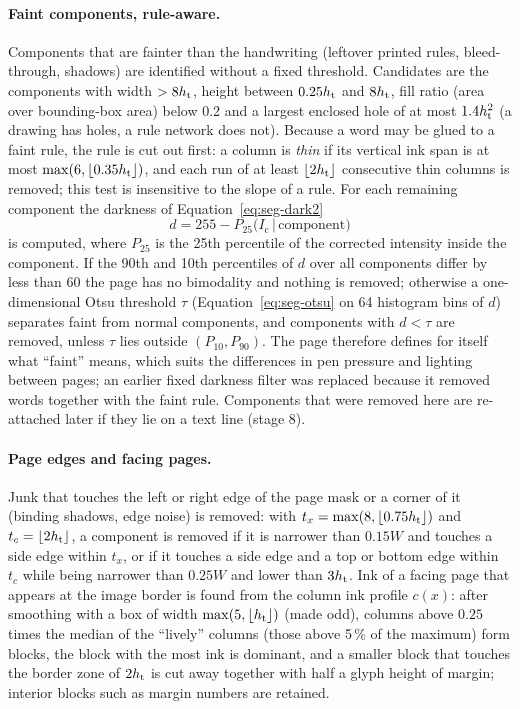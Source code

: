 \paragraph{Faint components, rule-aware.}
Components that are fainter than the handwriting (leftover printed rules, bleed-through, shadows) are identified without a fixed threshold.
Candidates are the components with width $>8h_{\mathrm{t}}$, height between $0.25h_{\mathrm{t}}$ and $8h_{\mathrm{t}}$, fill ratio (area over bounding-box area) below 0.2 and a largest enclosed hole of at most $1.4h_{\mathrm{t}}^2$ (a drawing has holes, a rule network does not).
Because a word may be glued to a faint rule, the rule is cut out first: a column is \emph{thin} if its vertical ink span is at most $\max(6,\lfloor0.35h_{\mathrm{t}}\rfloor)$, and each run of at least $\lfloor2h_{\mathrm{t}}\rfloor$ consecutive thin columns is removed; this test is insensitive to the slope of a rule.
For each remaining component the darkness of Equation~\ref{eq:seg-dark2}
\begin{equation}
d=255-P_{25}\bigl(I_{\mathrm c}\,\big|\,\text{component}\bigr)
\label{eq:seg-dark2}
\end{equation}
is computed, where $P_{25}$ is the 25th percentile of the corrected intensity inside the component.
If the 90th and 10th percentiles of $d$ over all components differ by less than 60 the page has no bimodality and nothing is removed; otherwise a one-dimensional Otsu threshold $\tau$ (Equation~\ref{eq:seg-otsu} on 64 histogram bins of $d$) separates faint from normal components, and components with $d<\tau$ are removed, unless $\tau$ lies outside $(P_{10},P_{90})$.
The page therefore defines for itself what ``faint'' means, which suits the differences in pen pressure and lighting between pages; an earlier fixed darkness filter was replaced because it removed words together with the faint rule.
Components that were removed here are re-attached later if they lie on a text line (stage 8).

\paragraph{Page edges and facing pages.}
Junk that touches the left or right edge of the page mask or a corner of it (binding shadows, edge noise) is removed: with $t_x=\max(8,\lfloor0.75h_{\mathrm{t}}\rfloor)$ and $t_c=\lfloor2h_{\mathrm{t}}\rfloor$, a component is removed if it is narrower than $0.15W$ and touches a side edge within $t_x$, or if it touches a side edge and a top or bottom edge within $t_c$ while being narrower than $0.25W$ and lower than $3h_{\mathrm{t}}$.
Ink of a facing page that appears at the image border is found from the column ink profile $c(x)$: after smoothing with a box of width $\max(5,\lfloor h_{\mathrm{t}}\rfloor)$ (made odd), columns above $0.25$ times the median of the ``lively'' columns (those above 5\,\% of the maximum) form blocks, the block with the most ink is dominant, and a smaller block that touches the border zone of $2h_{\mathrm{t}}$ is cut away together with half a glyph height of margin; interior blocks such as margin numbers are retained.

